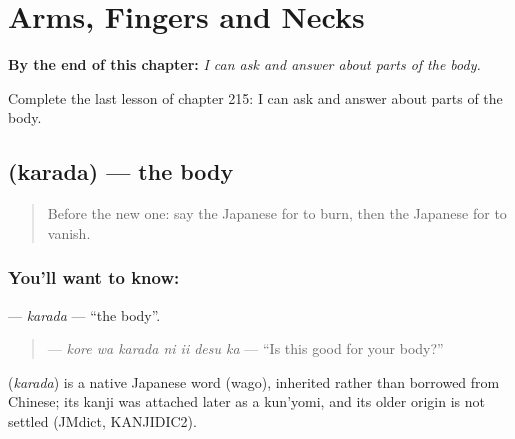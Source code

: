 
\chapter{Arms, Fingers and Necks}
\label{ch:ja-arms-fingers-and-necks}

\begin{chapteropening}
\textbf{By the end of this chapter:} \emph{I can ask and answer about parts of the body.}

Complete the last lesson of chapter 215: I can ask and answer about parts of the body.
\end{chapteropening}

\section[\texorpdfstring{\ja{からだ} (karada)}{からだ (karada)}]{ (karada) — the body}

\label{lesson:JA-C215-karada}



\begin{quote}
Before the new one: say the Japanese for to burn, then the Japanese for to vanish.
\end{quote}

\subsection*{You'll want to know: }
\textbf{} — \emph{karada} — \textquotedblleft{}the body\textquotedblright{}.

\begin{quote}
\textbf{  } — \emph{kore wa karada ni ii desu ka} — \textquotedblleft{}Is this good for your body?\textquotedblright{}
\end{quote}

\begin{cousinweb}
\textbf{} (\emph{karada}) is a native Japanese word (wago), inherited rather than borrowed from Chinese; its kanji was attached later as a kun'yomi, and its older origin is not settled (JMdict, KANJIDIC2).
\end{cousinweb}

